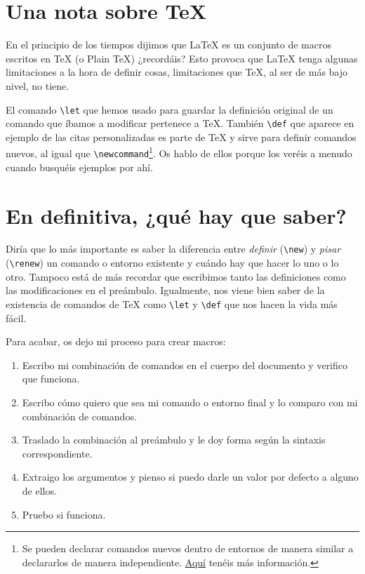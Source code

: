 \section{Una nota sobre TeX}

En el principio de los tiempos dijimos que LaTeX es un conjunto de
macros escritos en TeX (o Plain TeX) ¿recordáis? Esto provoca que LaTeX
tenga algunas limitaciones a la hora de definir cosas, limitaciones que
TeX, al ser de más bajo nivel, no tiene.

El comando \lstinline!\let! que hemos usado para guardar la definición
original de un comando que íbamos a modificar pertenece a TeX. También
\lstinline!\def! que
aparece en ejemplo de las citas personalizadas es parte de TeX y sirve
para definir comandos nuevos, al igual que
\lstinline!\newcommand!\footnote{Se pueden declarar comandos nuevos
  dentro de entornos de manera similar a declararlos de manera
  independiente.
  \href{https://en.wikibooks.org/wiki/LaTeX/Macros\#Declare_commands_within_new_environment}{Aquí}
  tenéis más información.}. Os hablo de ellos porque los veréis a menudo
cuando busquéis ejemplos por ahí.

\section{En definitiva, ¿qué hay que
saber?}

Diría que lo más importante es saber la diferencia entre \emph{definir}
(\lstinline!\new!) y \emph{pisar} (\lstinline!\renew!) un comando o
entorno existente y cuándo hay que hacer lo uno o lo otro. Tampoco está
de más recordar que escribimos tanto las definiciones como las
modificaciones en el preámbulo. Igualmente, nos viene bien saber de la
existencia de comandos de TeX como \lstinline!\let! y \lstinline!\def!
que nos hacen la vida más fácil.

Para acabar, os dejo mi proceso para crear macros:

\begin{enumerate}
\def\labelenumi{\arabic{enumi}.}
\item
  Escribo mi combinación de comandos en el cuerpo del documento y
  verifico que funciona.
\item
  Escribo cómo quiero que sea mi comando o entorno final y lo comparo
  con mi combinación de comandos.
\item
  Traslado la combinación al preámbulo y le doy forma según la sintaxis
  correspondiente.
\item
  Extraigo los argumentos y pienso si puedo darle un valor por defecto a
  alguno de ellos.
\item
  Pruebo si funciona.
\end{enumerate}

